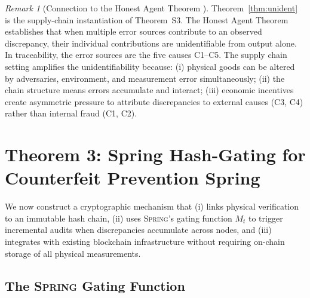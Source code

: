 \documentclass[11pt,a4paper]{article}
\theoremstyle{definition}
\theoremstyle{remark}
\newtheorem{remark}[theorem]{Remark}
\newcommand{\Spring}{\textsc{Spring}}
\newcommand{\ThmSCXHonest}{Theorem~S3}
\begin{document}
\begin{remark}[Connection to the Honest Agent Theorem ]
\label{rem:honest_connection}
Theorem~\ref{thm:unident} is the supply-chain instantiation of \ThmSCXHonest{}. The Honest Agent Theorem establishes that when multiple error sources contribute to an observed discrepancy, their individual contributions are unidentifiable from output alone. In traceability, the error sources are the five causes C1--C5. The supply chain setting amplifies the unidentifiability because: (i) physical goods can be altered by adversaries, environment, and measurement error simultaneously; (ii) the chain structure means errors accumulate and interact; (iii) economic incentives create asymmetric pressure to attribute discrepancies to external causes (C3, C4) rather than internal fraud (C1, C2).
\end{remark}

\section{Theorem 3: Spring Hash-Gating for Counterfeit Prevention Spring}
\label{sec:theorem3}

We now construct a cryptographic mechanism that (i) links physical verification to an immutable hash chain, (ii) uses \Spring{}'s gating function $M_t$ to trigger incremental audits when discrepancies accumulate across nodes, and (iii) integrates with existing blockchain infrastructure without requiring on-chain storage of all physical measurements.

\subsection{The \Spring{} Gating Function}
\end{document}
